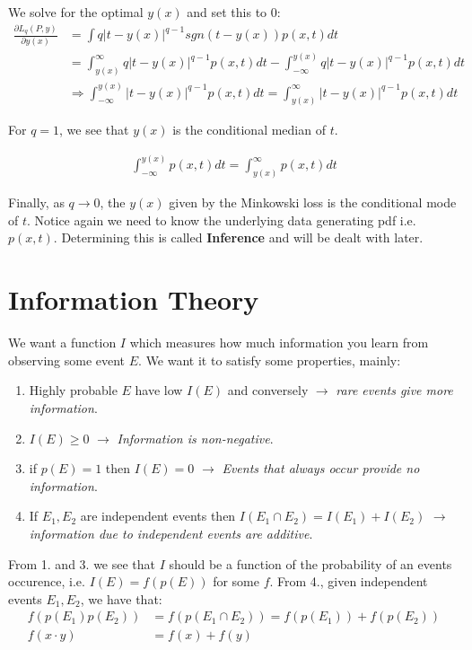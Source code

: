 \documentclass[]{article}
\theoremstyle{mattstyle}
\theoremstyle{definition}
\begin{document}
We solve for the optimal $y(x)$ and set this to 0:
\begin{align}
\frac{\partial L_q(P,y)}{\partial y(x)} &= \int q|t-y(x)|^{q-1} sgn(t-y(x)) p(x,t)dt\\
&= \int_{y(x)}^{\infty} q|t-y(x)|^{q-1}p(x,t)dt-\int_{-\infty}^{y(x)} q|t-y(x)|^{q-1}p(x,t)dt\\
&\Rightarrow \int_{-\infty}^{y(x)} |t-y(x)|^{q-1}p(x,t)dt = \int_{y(x)}^{\infty} |t-y(x)|^{q-1}p(x,t)dt
\end{align}

For $q=1$, we see that $y(x)$ is the conditional median of $t$.

\begin{align}
\int_{-\infty}^{y(x)} p(x,t)dt = \int_{y(x)}^{\infty} p(x,t)dt
\end{align}

Finally, as $q \rightarrow 0$, the $y(x)$ given by the Minkowski loss is the conditional mode of $t$. Notice again we need to know the underlying data generating pdf i.e. $p(x, t)$. Determining this is called \textbf{Inference} and will be dealt with later.

\newpage

\section{Information Theory}

We want a function $I$ which measures how much information you learn from observing some event $E$. We want it to satisfy some properties, mainly:

\begin{enumerate}
	\item Highly probable $E$ have low $I(E)$ and conversely $\rightarrow$ \emph{ rare events give more information}.
	\item $I(E) \ge 0$ $\rightarrow$\emph{ Information is non-negative}.
	\item if $p(E)=1$ then $I(E) = 0$ $\rightarrow$\emph{ Events that always occur provide no information}.
	\item If $E_1, E_2$ are independent events then $I(E_1 \cap E_2) = I(E_1) + I(E_2)$ $\rightarrow$\emph{ information due to independent events are additive}.
\end{enumerate}
From 1. and 3. we see that $I$ should be a function of the probability of an events occurence, i.e. $I(E)=f(p(E))$ for some $f$. From 4., given independent events $E_1, E_2$, we have that:
\begin{align}\label{eq:entnec}
f(p(E_1)p(E_2)) &= f(p(E_1\cap E_2)) = f(p(E_1)) + f(p(E_2))\\
f(x\cdot y) &= f(x) + f(y)
\end{align}
\end{document}
